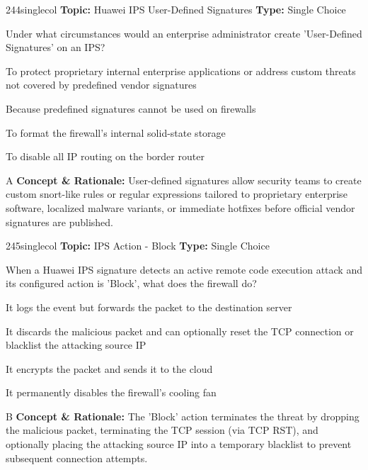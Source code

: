 \begin{qcard}{244}{singlecol}
\textcolor{darkslate!75}{\small\textbf{Topic:} Huawei IPS User-Defined Signatures \hfill \textbf{Type:} Single Choice}\vspace{0.4em}\par
Under what circumstances would an enterprise administrator create 'User-Defined Signatures' on an IPS?
\begin{qoptions}
\item To protect proprietary internal enterprise applications or address custom threats not covered by predefined vendor signatures
\item Because predefined signatures cannot be used on firewalls
\item To format the firewall's internal solid-state storage
\item To disable all IP routing on the border router
\end{qoptions}
\end{qcard}
\nopagebreak
\begin{explainbox}{A}
\textbf{Concept \& Rationale:} User-defined signatures allow security teams to create custom snort-like rules or regular expressions tailored to proprietary enterprise software, localized malware variants, or immediate hotfixes before official vendor signatures are published.
\end{explainbox}

\begin{qcard}{245}{singlecol}
\textcolor{darkslate!75}{\small\textbf{Topic:} IPS Action - Block \hfill \textbf{Type:} Single Choice}\vspace{0.4em}\par
When a Huawei IPS signature detects an active remote code execution attack and its configured action is 'Block', what does the firewall do?
\begin{qoptions}
\item It logs the event but forwards the packet to the destination server
\item It discards the malicious packet and can optionally reset the TCP connection or blacklist the attacking source IP
\item It encrypts the packet and sends it to the cloud
\item It permanently disables the firewall's cooling fan
\end{qoptions}
\end{qcard}
\nopagebreak
\begin{explainbox}{B}
\textbf{Concept \& Rationale:} The 'Block' action terminates the threat by dropping the malicious packet, terminating the TCP session (via TCP RST), and optionally placing the attacking source IP into a temporary blacklist to prevent subsequent connection attempts.
\end{explainbox}

